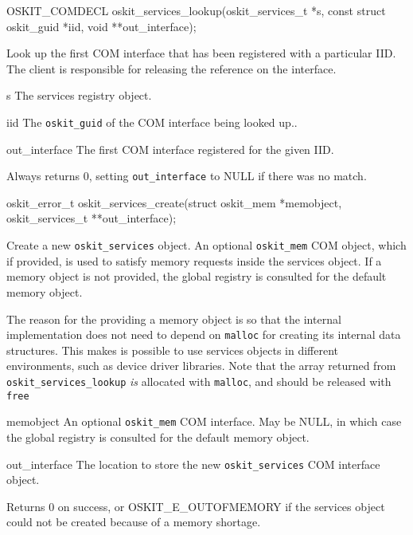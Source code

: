 \begin{apisyn}

	\funcproto OSKIT_COMDECL
	oskit_services_lookup(oskit_services_t *s,
			  const struct oskit_guid *iid,
                          \outparam void **out_interface);
\end{apisyn}
\begin{apidesc}
	Look up the first COM interface that has been registered with a
	particular IID\@. The client is responsible for releasing the
	reference on the interface.
\end{apidesc}
\begin{apiparm}
	\item[s]
		The services registry object.
	\item[iid]
		The {\tt oskit_guid} of the COM interface being looked up..
	\item[out_interface]
		The first COM interface registered for the given IID.
\end{apiparm}
\begin{apiret}
	Always returns 0, setting {\tt out_interface} to NULL if there was
	no match.
\end{apiret}

\begin{apisyn}

	\funcproto oskit_error_t
	oskit_services_create(struct oskit_mem *memobject,
			      \outparam oskit_services_t **out_interface);
\end{apisyn}
\begin{apidesc}
	Create a new \texttt{oskit_services} object. An optional
	\texttt{oskit_mem} COM object, which if provided, is used to
	satisfy memory requests inside the services object. If a memory
	object is not provided, the global registry is consulted for the
	default memory object.

	The reason for the providing a memory object is so that the
	internal implementation does not need to depend on \texttt{malloc}
	for creating its internal data structures. This makes is possible
	to use services objects in different environments, such as device
	driver libraries. Note that the array returned from
	\texttt{oskit_services_lookup} \emph{is} allocated with
	\texttt{malloc}, and should be released with \texttt{free}
\end{apidesc}
\begin{apiparm}
	\item[memobject]
		An optional \texttt{oskit_mem} COM interface. May be NULL,
		in which case the global registry is consulted for the
		default memory object.
	\item[out_interface]
		The location to store the new \texttt{oskit_services} COM
		interface object.
\end{apiparm}
\begin{apiret}
	Returns 0 on success, or OSKIT_E_OUTOFMEMORY if the services object
	could not be created because of a memory shortage. 
\end{apiret}

